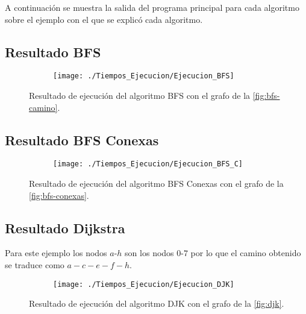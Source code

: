 A continuación se muestra la salida del programa principal para cada algoritmo sobre el ejemplo con el que se explicó cada algoritmo.

\subsection{Resultado BFS}

\begin{figure}[!htb]
	\centering
	\begin{subfigure}{\linewidth}
		\texttt{[image: ./Tiempos\_Ejecucion/Ejecucion\_BFS]}
	\end{subfigure}
	
	\caption{Resultado de ejecución del algoritmo BFS con el grafo de la \autoref{fig:bfs-camino}.}
	\label{fig:resultado_BFS}
\end{figure}

\subsection{Resultado BFS Conexas}

\begin{figure}[!htb]
	\centering
	\begin{subfigure}{\linewidth}
		\texttt{[image: ./Tiempos\_Ejecucion/Ejecucion\_BFS\_C]}
	\end{subfigure}
	
	\caption{Resultado de ejecución del algoritmo BFS Conexas con el grafo de la \autoref{fig:bfs-conexas}.}
	\label{fig:resultado_BFS_C}
\end{figure}

\subsection{Resultado Dijkstra}

Para este ejemplo los nodos $a$-$h$ son los nodos $0$-$7$ por lo que el camino obtenido se traduce como $a - c - e - f - h$.

\begin{figure}[!htb]
	\centering
	\begin{subfigure}{\linewidth}
		\texttt{[image: ./Tiempos\_Ejecucion/Ejecucion\_DJK]}
	\end{subfigure}
	
	\caption{Resultado de ejecución del algoritmo DJK con el grafo de la \autoref{fig:djk}.}
	\label{fig:resultado_DJK}
\end{figure}

